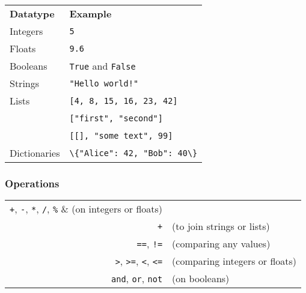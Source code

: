 \documentclass[12pt,twocolumn]{article}
\begin{document}
	
	\begin{tabular}{l l}
		\textbf{Datatype} & \textbf{Example} \\

		Integers &
		\colorbox{codebg}{\lstinline|5|} \\
		
		Floats &
		\colorbox{codebg}{\lstinline|9.6|} \\
		
		Booleans &
		\colorbox{codebg}{\lstinline|True|} and \colorbox{codebg}{\lstinline|False|} \\
		
		Strings &
		\colorbox{codebg}{\lstinline|"Hello world!"|} \\
		
		Lists &
		\colorbox{codebg}{\lstinline|[4, 8, 15, 16, 23, 42]|} \vspace{0.5mm} \\
		~ &
		\colorbox{codebg}{\lstinline|["first", "second"]|} \vspace{0.5mm} \\
		~ &
		\colorbox{codebg}{\lstinline|[[], "some text", 99]|} \vspace{0.5mm} \\
		
		Dictionaries &
		\colorbox{codebg}{\lstinline|\{"Alice": 42, "Bob": 40\}|}
	\end{tabular}
	
	\subsubsection*{Operations}
	
	\begin{tabular}{r l}
		\lstinline|+|, \lstinline|-|, \lstinline|*|, \lstinline|/|, \lstinline|%| &
		(on integers or floats) \\
	
		\lstinline|+| & (to join strings or lists) \\
	
		\lstinline|==|, \lstinline|!=| & (comparing any values) \\
	
		\lstinline|>|, \lstinline|>=|, \lstinline|<|, \lstinline|<=| &
		(comparing integers or floats) \\
		
		\lstinline|and|, \lstinline|or|, \lstinline|not| & (on booleans)
	\end{tabular}
	
\end{document}
